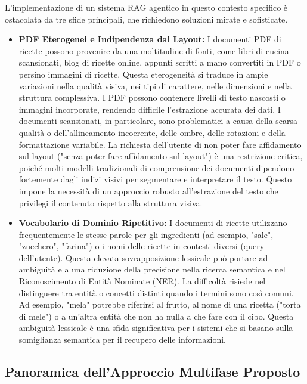 \documentclass[a4paper, 11pt]{article}
\begin{document}
L'implementazione di un sistema RAG agentico in questo contesto specifico è ostacolata da tre sfide principali, che richiedono soluzioni mirate e sofisticate.
\begin{itemize}
    \item \textbf{PDF Eterogenei e Indipendenza dal Layout:} I documenti PDF di ricette possono provenire da una moltitudine di fonti, come libri di cucina scansionati, blog di ricette online, appunti scritti a mano convertiti in PDF o persino immagini di ricette. Questa eterogeneità si traduce in ampie variazioni nella qualità visiva, nei tipi di carattere, nelle dimensioni e nella struttura complessiva. \cite{ocr_best_practices} I PDF possono contenere livelli di testo nascosti o immagini incorporate, rendendo difficile l'estrazione accurata dei dati. \cite{algodocs_challenges} I documenti scansionati, in particolare, sono problematici a causa della scarsa qualità o dell'allineamento incoerente, delle ombre, delle rotazioni e della formattazione variabile. \cite{algodocs_challenges} La richiesta dell'utente di non poter fare affidamento sul layout ("senza poter fare affidamento sul layout") è una restrizione critica, poiché molti modelli tradizionali di comprensione dei documenti dipendono fortemente dagli indizi visivi per segmentare e interpretare il testo. \cite{amazon_science_heterogenous} Questo impone la necessità di un approccio robusto all'estrazione del testo che privilegi il contenuto rispetto alla struttura visiva.
    \item \textbf{Vocabolario di Dominio Ripetitivo:} I documenti di ricette utilizzano frequentemente le stesse parole per gli ingredienti (ad esempio, "sale", "zucchero", "farina") o i nomi delle ricette in contesti diversi (query dell'utente). Questa elevata sovrapposizione lessicale può portare ad ambiguità e a una riduzione della precisione nella ricerca semantica e nel Riconoscimento di Entità Nominate (NER). La difficoltà risiede nel distinguere tra entità o concetti distinti quando i termini sono così comuni. Ad esempio, "mela" potrebbe riferirsi al frutto, al nome di una ricetta ("torta di mele") o a un'altra entità che non ha nulla a che fare con il cibo. Questa ambiguità lessicale è una sfida significativa per i sistemi che si basano sulla somiglianza semantica per il recupero delle informazioni. \cite{nlp_challenges}
\end{itemize}

\subsection{Panoramica dell'Approccio Multifase Proposto}
\end{document}
